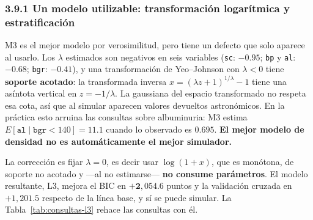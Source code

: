 \documentclass[11pt, a4paper]{article}
\begin{document}
\subsubsection*{3.9.1 Un modelo utilizable: transformación logarítmica y estratificación}

M3 es el mejor modelo por verosimilitud, pero tiene un defecto que solo aparece al usarlo. Los
$\lambda$ estimados son negativos en seis variables (\texttt{sc}: $-0.95$; \texttt{bp} y
\texttt{al}: $-0.68$; \texttt{bgr}: $-0.41$), y una transformación de Yeo--Johnson con
$\lambda < 0$ tiene \textbf{soporte acotado}: la transformada inversa
$x = (\lambda z + 1)^{1/\lambda} - 1$ tiene una asíntota vertical en $z = -1/\lambda$. La gaussiana
del espacio transformado no respeta esa cota, así que al simular aparecen valores devueltos
astronómicos. En la práctica esto arruina las consultas sobre albuminuria: M3 estima
$E[\texttt{al} \mid \texttt{bgr} < 140] = 11.1$ cuando lo observado es $0.695$. \textbf{El mejor
modelo de densidad no es automáticamente el mejor simulador.}

La corrección es fijar $\lambda = 0$, es decir usar $\log(1+x)$, que es monótona, de soporte no
acotado y —al no estimarse— \textbf{no consume parámetros}. El modelo resultante, L3, mejora el
BIC en $\mathbf{+2{,}054.6}$ puntos y la validación cruzada en $+1{,}201.5$ respecto de la línea
base, y sí se puede simular. La Tabla~\ref{tab:consultas-l3} rehace las consultas con él.
\end{document}
